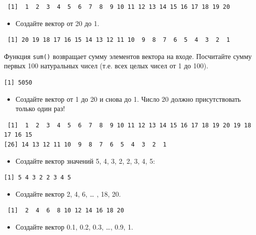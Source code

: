 \documentclass[
]{book}
\providecommand{\tightlist}{%
  \setlength{\itemsep}{0pt}\setlength{\parskip}{0pt}}
\begin{document}
\begin{verbatim}
 [1]  1  2  3  4  5  6  7  8  9 10 11 12 13 14 15 16 17 18 19 20
\end{verbatim}

\begin{itemize}
\tightlist
\item
  Создайте вектор от 20 до 1.
\end{itemize}

\begin{verbatim}
 [1] 20 19 18 17 16 15 14 13 12 11 10  9  8  7  6  5  4  3  2  1
\end{verbatim}

Функция \texttt{sum()} возвращает сумму элементов вектора на входе. Посчитайте сумму первых 100 натуральных чисел (т.е. всех целых чисел от 1 до 100).

\begin{verbatim}
[1] 5050
\end{verbatim}

\begin{itemize}
\tightlist
\item
  Создайте вектор от 1 до 20 и снова до 1. Число 20 должно присутствовать только один раз!
\end{itemize}

\begin{verbatim}
 [1]  1  2  3  4  5  6  7  8  9 10 11 12 13 14 15 16 17 18 19 20 19 18 17 16 15
[26] 14 13 12 11 10  9  8  7  6  5  4  3  2  1
\end{verbatim}

\begin{itemize}
\tightlist
\item
  Создайте вектор значений 5, 4, 3, 2, 2, 3, 4, 5:
\end{itemize}

\begin{verbatim}
[1] 5 4 3 2 2 3 4 5
\end{verbatim}

\begin{itemize}
\tightlist
\item
  Создайте вектор 2, 4, 6, \ldots{} , 18, 20.
\end{itemize}

\begin{verbatim}
 [1]  2  4  6  8 10 12 14 16 18 20
\end{verbatim}

\begin{itemize}
\tightlist
\item
  Создайте вектор 0.1, 0.2, 0.3, \ldots, 0.9, 1.
\end{itemize}
\end{document}
